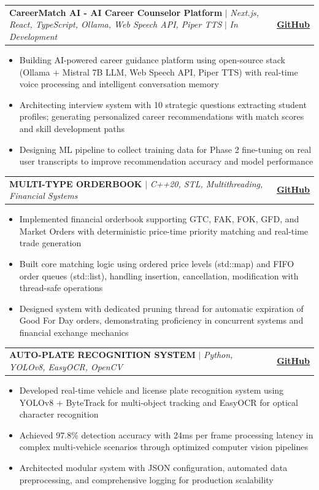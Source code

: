 \documentclass[a4paper,12pt]{article}
\makeatletter
\newcommand{\resumeItem}[1]{
  \item\small{
    {#1 \vspace{-2pt}}
  }
}
\newcommand{\resumeProjectHeading}[2]{
    \item
    \begin{tabular*}{1.001\textwidth}{l@{\extracolsep{\fill}}r}
      \small#1 & \textbf{\small #2}\\
    \end{tabular*}\vspace{-7pt}
}
\newcommand{\resumeItemListStart}{\begin{itemize}}
\newcommand{\resumeItemListEnd}{\end{itemize}\vspace{-5pt}}
\makeatother
\begin{document}
      \resumeProjectHeading
          {\textbf{CareerMatch AI - AI Career Counselor Platform} $|$ \emph{Next.js, React, TypeScript, Ollama, Web Speech API, Piper TTS} $|$ \textit{In Development}}{\href{https://github.com/Kushagra614/CareerMatchAI}{\underline{GitHub}}}
          \resumeItemListStart
            \resumeItem{Building AI-powered career guidance platform using open-source stack (Ollama + Mistral 7B LLM, Web Speech API, Piper TTS) with real-time voice processing and intelligent conversation memory}
            \resumeItem{Architecting interview system with 10 strategic questions extracting student profiles; generating personalized career recommendations with match scores and skill development paths}
            \resumeItem{Designing ML pipeline to collect training data for Phase 2 fine-tuning on real user transcripts to improve recommendation accuracy and model performance}
          \resumeItemListEnd
          \vspace{-13pt}

      \resumeProjectHeading
          {\textbf{MULTI-TYPE ORDERBOOK} $|$ \emph{C++20, STL, Multithreading, Financial Systems}}{\href{https://github.com/Kushagra614/Multi-Type-Orderbook}{\underline{GitHub}}}
          \resumeItemListStart
            \resumeItem{Implemented financial orderbook supporting GTC, FAK, FOK, GFD, and Market Orders with deterministic price-time priority matching and real-time trade generation}
            \resumeItem{Built core matching logic using ordered price levels (std::map) and FIFO order queues (std::list), handling insertion, cancellation, modification with thread-safe operations}
            \resumeItem{Designed system with dedicated pruning thread for automatic expiration of Good For Day orders, demonstrating proficiency in concurrent systems and financial exchange mechanics}
          \resumeItemListEnd
          \vspace{-13pt}

      \resumeProjectHeading
          {\textbf{AUTO-PLATE RECOGNITION SYSTEM} $|$ \emph{Python, YOLOv8, EasyOCR, OpenCV}}{\href{https://github.com/Kushagra614/AutoPlate-Recognition}{\underline{GitHub}}}
          \resumeItemListStart
            \resumeItem{Developed real-time vehicle and license plate recognition system using YOLOv8 + ByteTrack for multi-object tracking and EasyOCR for optical character recognition}
            \resumeItem{Achieved 97.8\% detection accuracy with 24ms per frame processing latency in complex multi-vehicle scenarios through optimized computer vision pipelines}
            \resumeItem{Architected modular system with JSON configuration, automated data preprocessing, and comprehensive logging for production scalability}
          \resumeItemListEnd
          
\end{document}
